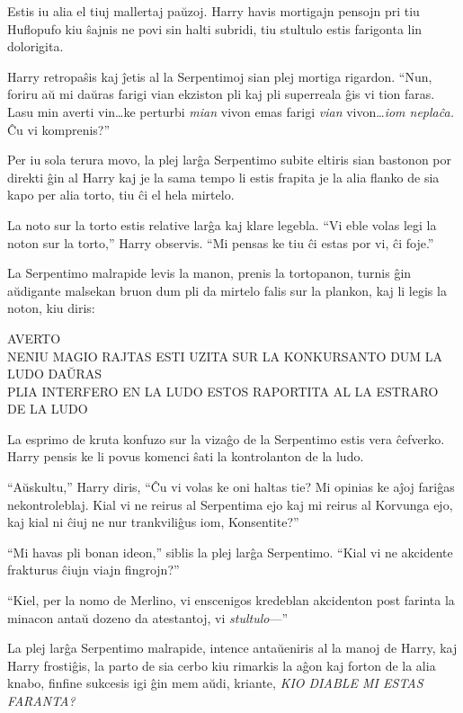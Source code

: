 Estis iu alia el tiuj mallertaj paŭzoj. Harry havis mortigajn pensojn pri tiu
Huflopufo kiu ŝajnis ne povi sin halti subridi, tiu stultulo estis farigonta lin
dolorigita.

Harry retropaŝis kaj ĵetis al la Serpentimoj sian plej mortiga rigardon. ``Nun,
foriru aŭ mi daŭras farigi vian ekziston pli kaj pli superreala ĝis vi tion
faras. Lasu min averti vin\ldots ke perturbi \emph{mian} vivon emas farigi
\emph{vian} vivon\ldots \emph{iom neplaĉa.} Ĉu vi komprenis?''

Per iu sola terura movo, la plej larĝa Serpentimo subite eltiris sian bastonon
por direkti ĝin al Harry kaj je la sama tempo li estis frapita je la alia flanko
de sia kapo per alia torto, tiu ĉi el hela mirtelo.

La noto sur la torto estis relative larĝa kaj klare legebla. ``Vi eble
volas legi la noton sur la torto,'' Harry observis. ``Mi pensas ke
tiu ĉi estas por vi, ĉi foje.'' 

La Serpentimo malrapide levis la manon, prenis la tortopanon, turnis ĝin
aŭdigante malsekan bruon dum pli da mirtelo falis sur la plankon, kaj li legis
la noton, kiu diris:

\begin{center}
  AVERTO\\

  NENIU MAGIO RAJTAS ESTI UZITA SUR LA KONKURSANTO DUM LA LUDO DAŬRAS\\
  PLIA INTERFERO EN LA LUDO ESTOS RAPORTITA AL LA ESTRARO DE LA LUDO
\end{center}

La esprimo de kruta konfuzo sur la vizaĝo de la Serpentimo estis vera
ĉefverko. Harry pensis ke li povus komenci ŝati la kontrolanton de la
ludo.

``Aŭskultu,'' Harry diris, ``Ĉu vi volas ke oni haltas tie? Mi opinias ke aĵoj
fariĝas nekontroleblaj. Kial vi ne reirus al Serpentima ejo kaj mi reirus al
Korvunga ejo, kaj kial ni ĉiuj ne nur trankviliĝus iom, Konsentite?''

``Mi havas pli bonan ideon,'' siblis la plej larĝa Serpentimo. ``Kial vi ne
akcidente frakturus ĉiujn viajn fingrojn?''

``Kiel, per la nomo de Merlino, vi enscenigos kredeblan akcidenton post
farinta la minacon antaŭ dozeno da atestantoj, vi \emph{stultulo}—''


La plej larĝa Serpentimo malrapide, intence antaŭeniris al la manoj de
Harry, kaj Harry frostiĝis, la parto de sia cerbo kiu rimarkis la aĝon
kaj forton de la alia knabo, finfine sukcesis igi ĝin mem aŭdi,
kriante, \emph{KIO DIABLE MI ESTAS FARANTA?}


